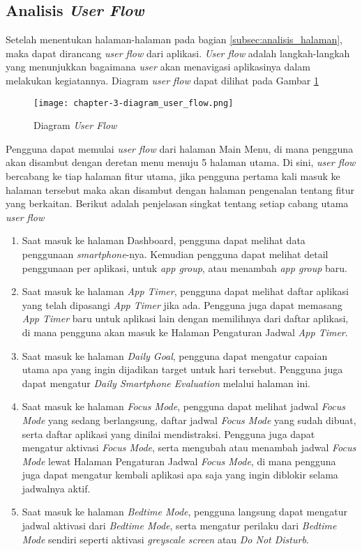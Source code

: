 \subsection{Analisis \textit{User Flow}}
\label{subsec:analisis_user_flow}

Setelah menentukan halaman-halaman pada bagian \ref{subsec:analisis_halaman}, maka dapat dirancang \textit{user flow} dari aplikasi. \textit{User flow} adalah langkah-langkah yang menunjukkan bagaimana \textit{user} akan menavigasi aplikasinya dalam melakukan kegiatannya. Diagram \textit{user flow} dapat dilihat pada Gambar \ref{fig:diagram_user_flow}  

\begin{figure}[h]
  \centering
  \texttt{[image: chapter-3-diagram\_user\_flow.png]}
  \caption{Diagram \textit{User Flow}}
  \label{fig:diagram_user_flow}
\end{figure}
\FloatBarrier

Pengguna dapat memulai \textit{user flow} dari halaman Main Menu, di mana pengguna akan disambut dengan deretan menu menuju 5 halaman utama. Di sini, \textit{user flow} bercabang ke tiap halaman fitur utama, jika pengguna pertama kali masuk ke halaman tersebut maka akan disambut dengan halaman pengenalan tentang fitur yang berkaitan. Berikut adalah penjelasan singkat tentang setiap cabang utama \textit{user flow}

\begin{enumerate}
  \item Saat masuk ke halaman Dashboard, pengguna dapat melihat data penggunaan \textit{smartphone}-nya. Kemudian pengguna dapat melihat detail penggunaan per aplikasi, untuk \textit{app group}, atau menambah \textit{app group} baru.
  \item Saat masuk ke halaman \textit{App Timer}, pengguna dapat melihat daftar aplikasi yang telah dipasangi \textit{App Timer} jika ada. Pengguna juga dapat memasang \textit{App Timer} baru untuk aplikasi lain dengan memilihnya dari daftar aplikasi, di mana pengguna akan masuk ke Halaman Pengaturan Jadwal \textit{App Timer}.
  \item Saat masuk ke halaman \textit{Daily Goal}, pengguna dapat mengatur capaian utama apa yang ingin dijadikan target untuk hari tersebut. Pengguna juga dapat mengatur \textit{Daily Smartphone Evaluation} melalui halaman ini.
  \item Saat masuk ke halaman \textit{Focus Mode}, pengguna dapat melihat jadwal \textit{Focus Mode} yang sedang berlangsung, daftar jadwal \textit{Focus Mode} yang sudah dibuat, serta daftar aplikasi yang dinilai mendistraksi. Pengguna juga dapat mengatur aktivasi \textit{Focus Mode}, serta mengubah atau menambah jadwal \textit{Focus Mode} lewat Halaman Pengaturan Jadwal \textit{Focus Mode}, di mana pengguna juga dapat mengatur kembali aplikasi apa saja yang ingin diblokir selama jadwalnya aktif.
  \item Saat masuk ke halaman \textit{Bedtime Mode}, pengguna langsung dapat mengatur jadwal aktivasi dari \textit{Bedtime Mode}, serta mengatur perilaku dari \textit{Bedtime Mode} sendiri seperti aktivasi \textit{greyscale screen} atau \textit{Do Not Disturb}.
\end{enumerate}

